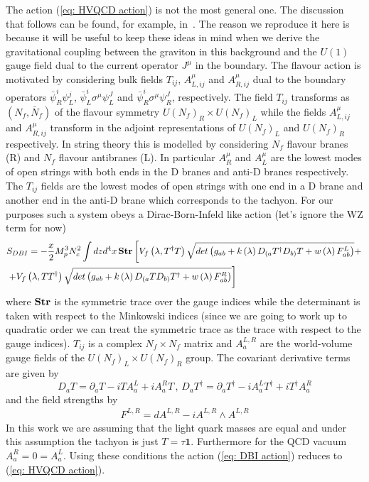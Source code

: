 \documentclass[10 pt]{article}
\begin{document}
The action (\ref{eq: HVQCD action}) is not the most general one. The discussion that follows can be found, for example, in~\cite{Jarvinen:2011qe}. The reason we reproduce it here is because it will be useful to keep these ideas in mind when we derive the gravitational coupling between the graviton in this background and the $U(1)$ gauge field dual to the current operator $J^\mu$ in the boundary. The flavour action is motivated by considering bulk fields $T_{ij}$, $A^\mu_{L, i j}$ and $A^\mu_{R, i j}$ dual to the boundary operators $\bar{\psi}^i_R \psi^j_L$, $\bar{\psi}^i_L \sigma^\mu \psi^J_L$ and $\bar{\psi}^i_R \sigma^\mu \psi^J_R$, respectively. The field $T_{ij}$ transforms as $\left(N_f, \bar{N}_f \right)$ of the flavour symmetry $U\left(N_f\right)_R \times U \left(N_f\right)_L$ while the fields $A^\mu_{L, i j}$ and $A^\mu_{R, i j}$ transform in the adjoint representations of $U\left(N_f\right)_L$ and  $U \left(N_f\right)_R$ respectively. In string theory this is modelled by considering $N_f$ flavour branes (R) and $N_f$ flavour antibranes (L). In particular $A^\mu_R$ and $A^\mu_L$ are the lowest modes of open strings with both ends in the D branes and anti-D branes respectively. The $T_{ij}$ fields are the lowest modes of open strings with one end in a D brane and another end in the anti-D brane which corresponds to the tachyon. For our purposes such a system obeys a Dirac-Born-Infeld like action (let's ignore the WZ term for now)
\begin{align}
&S_{DBI} = - \frac{x}{2} M_p^3 N_c^2 \int dz d^4 x \, \bold{Str} \left[ V_f \left(\lambda, T^{\dagger} T\right) \sqrt{det\left( g_{ab} + k\left(\lambda\right)D_{(a}T^{\dagger}D_{b)}T + w\left(\lambda\right) F^{L}_{ab}\right)} + \right. \\ \notag
&\left. + V_f \left(\lambda, T T^{\dagger} \right) \sqrt{det\left( g_{ab} + k\left(\lambda\right)D_{(a}TD_{b)}T^{\dagger} + w\left(\lambda\right) F^{R}_{ab}\right)}  \right]
\label{eq: DBI action}
\end{align}
where $\bold{Str}$ is the symmetric trace over the gauge indices while the determinant is taken with respect to the Minkowski indices (since we are going to work up to quadratic order we can treat the symmetric trace as the trace with respect to the gauge indices). $T_{ij}$ is a complex $N_f \times N_f$ matrix and $A^{L,R}_a$ are the world-volume gauge fields of the $U(N_f)_L \times U(N_f)_R$ group. The covariant derivative terms are given by
\begin{equation}
D_a T = \partial_a T - i T A^L_a + i A^R_a T \, , \, D_a T^{\dagger} = \partial_a T^{\dagger} - i  A^L_a T^{\dagger}+ i T^{\dagger} A^R_a 
\end{equation}
and the field strengths by
\begin{align}
F^{L,R} = d A^{L,R} - i A^{L,R} \wedge A^{L,R}
\end{align}
In this work we are assuming that the light quark masses are equal and under this assumption the tachyon is just $T = \tau \mathbf{1}$. Furthermore for the QCD vacuum $A^R_a = 0 = A^L_a$. Using these conditions the action (\ref{eq: DBI action}) reduces to (\ref{eq: HVQCD action}).
\end{document}
